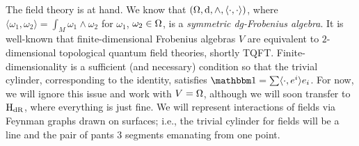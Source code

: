 \documentclass[\MainFolder/Text.tex]{subfiles}
\begin{document}
The field theory is at hand. We know that $(\Omega,\mathrm{d},\wedge,\langle\cdot,\cdot\rangle)$, where $\langle\omega_1,\omega_2\rangle = \int_M \omega_1 \wedge \omega_2$ for $\omega_1$, $\omega_2\in \Omega$, is a \emph{symmetric dg-Frobenius algebra}. It is well-known that finite-dimensional Frobenius algebras $V$ are equivalent to $2$-dimensional topological quantum field theories, shortly TQFT. Finite-dimensionality is a sufficient (and necessary) condition so that the trivial cylinder, corresponding to the identity, satisfies $\Id = \sum \langle \cdot,e^i\rangle e_i$. For now, we will ignore this issue and work with $V = \Omega$, although we will soon transfer to $\mathrm{H}_{\mathrm{dR}}$, where everything is just fine.
We will represent interactions of fields via Feynman graphs drawn on surfaces; i.e., the trivial cylinder for fields will be a line and the pair of pants $3$ segments emanating from one point.
\end{document}
